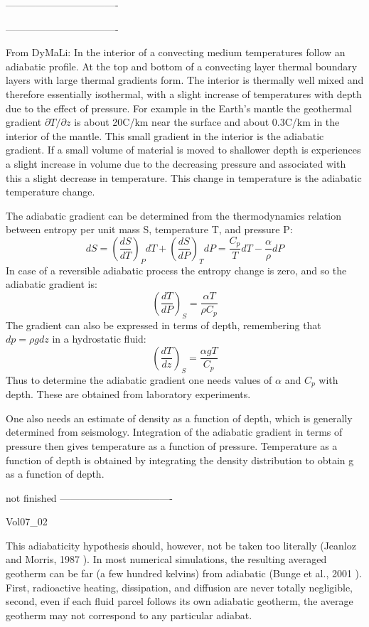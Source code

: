 ----------------------------------


----------------------------------

From DyMaLi: In the interior of a convecting medium temperatures follow an adiabatic profile. 
At the top and bottom of a convecting layer thermal boundary layers with large thermal gradients form. 
The interior is thermally well mixed and therefore essentially isothermal, with a slight increase 
of temperatures with depth due to the effect of pressure.
For example in the Earth’s mantle the geothermal gradient $\partial T /\partial z$ 
is about 20C/km near the 
surface and about 0.3C/km in the interior of the mantle. This small gradient in the 
interior is the adiabatic gradient. If a small
volume of material is moved to shallower depth is experiences a slight increase in volume 
due to the decreasing pressure and associated with this a slight decrease in temperature. 
This change in temperature is the adiabatic temperature change.

The adiabatic gradient can be determined from the thermodynamics relation between entropy per unit mass S,
temperature T, and pressure P:
\[
dS = \left( \frac{dS}{dT}\right)_P dT +  \left( \frac{dS}{dP}\right)_T dP
=
\frac{C_p }{T} dT - \frac{\alpha}{\rho} dP
\]
In case of a reversible adiabatic process the entropy change is zero, and so the adiabatic gradient is:
\[
\left( \frac{dT}{dP}\right)_S = \frac{\alpha T}{\rho C_p} 
\]
The gradient can also be expressed in terms of depth, remembering that $d p = \rho gdz$ 
in a hydrostatic fluid:
\[
\left( \frac{dT}{dz}\right)_S = \frac{\alpha g T}{C_p} 
\]
Thus to determine the adiabatic gradient one needs values of $\alpha$ 
and $C_p$ with depth. These are obtained from laboratory experiments.

One also needs an estimate of density as a function of depth, which is generally determined
from seismology. 
Integration of the adiabatic gradient in terms of pressure then gives
temperature as a function of pressure. 
Temperature as a function of depth is obtained by integrating the density
distribution to obtain g as a function of depth.

not finished
----------------------------------

Vol07\_02

This adiabaticity hypothesis should, however, not
be taken too literally (Jeanloz and Morris, 1987 \cite{jemo87}). In
most numerical simulations, the resulting averaged
geotherm can be far (a few hundred kelvins) from
adiabatic (Bunge et al., 2001 \cite{burm01}). First, radioactive 
heating, dissipation, and diffusion are never totally
negligible, second, even if each fluid parcel follows
its own adiabatic geotherm, the average geotherm
may not correspond to any particular adiabat.



